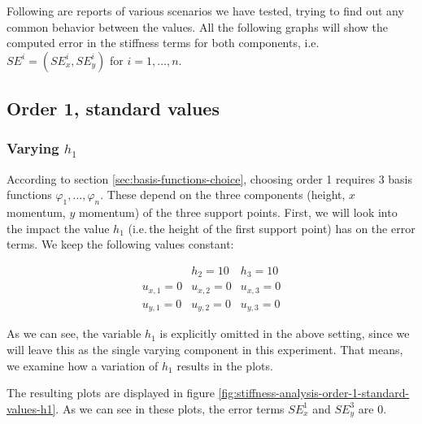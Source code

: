 \documentclass{article}
\renewcommand{\phi}{\varphi}
\begin{document}

Following are reports of various scenarios we have tested, trying to find out any common behavior between the values. All the following graphs will show the computed error in the stiffness terms for both components, i.e.\,$SE^i = \left(SE_x^i, SE_y^i\right)$ for $i=1,\dots, n$.

\subsection{Order 1, standard values}
\label{sec:stiffness-analysis-order-1-standard}

\subsubsection{\texorpdfstring{Varying $h_1$}{Varying h1}}
\label{sec:stiffness-analysis-standard-values-var-h1}

According to section \ref{sec:basis-functions-choice}, choosing order 1 requires 3 basis functions $\phi_1,\dots,\phi_n$. These depend on the three components (height, $x$ momentum, $y$ momentum) of the three support points. First, we will look into the impact the value $h_1$ (i.e.\,the height of the first support point) has on the error terms. We keep the following values constant:

\begin{eqnarray*}
  & h_2 = 10 & h_3 = 10 \\
  u_{x,1} = 0 & u_{x,2} = 0 & u_{x,3} = 0 \\
  u_{y,1} = 0 & u_{y,2} = 0 & u_{y,3} = 0
\end{eqnarray*}

As we can see, the variable $h_1$ is explicitly omitted in the above setting, since we will leave this as the single varying component in this experiment. That means, we examine how a variation of $h_1$ results in the plots.



The resulting plots are displayed in figure \ref{fig:stiffness-analysis-order-1-standard-values-h1}. As we can see in these plots, the error terms $SE_x^1$ and $SE_y^3$ are 0.
\end{document}
